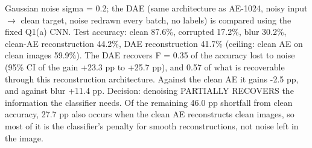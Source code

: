 Gaussian noise sigma = 0.2; the DAE (same architecture as AE-1024, noisy input $\rightarrow$ clean target, noise redrawn every batch, no labels) is compared using the fixed Q1(a) CNN. Test accuracy: clean 87.6\%, corrupted 17.2\%, blur 30.2\%, clean-AE reconstruction 44.2\%, DAE reconstruction 41.7\% (ceiling: clean AE on clean images 59.9\%). The DAE recovers F = 0.35 of the accuracy lost to noise (95\% CI of the gain +23.3 pp to +25.7 pp), and 0.57 of what is recoverable through this reconstruction architecture. Against the clean AE it gains -2.5 pp, and against blur +11.4 pp. Decision: denoising PARTIALLY RECOVERS the information the classifier needs. Of the remaining 46.0 pp shortfall from clean accuracy, 27.7 pp also occurs when the clean AE reconstructs clean images, so most of it is the classifier's penalty for smooth reconstructions, not noise left in the image.
